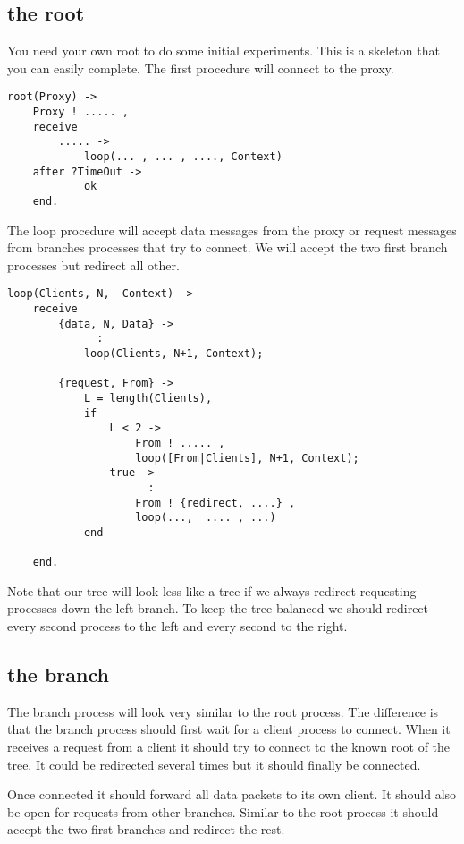 \documentclass[a4paper,11pt]{article}
\begin{document}
\subsection{the root}

You need your own root to do some initial experiments. This is a
skeleton that you can easily complete. The first procedure will
connect to the proxy.

\begin{verbatim}
root(Proxy) ->
    Proxy ! ..... ,
    receive 
        ..... ->
            loop(... , ... , ...., Context)
    after ?TimeOut ->
            ok
    end.
\end{verbatim}

The loop procedure will accept data messages from the proxy or request
messages from branches processes that try to connect. We will accept
the two first branch processes but redirect all other.

\begin{verbatim}
loop(Clients, N,  Context) ->
    receive 
        {data, N, Data} ->
              :
            loop(Clients, N+1, Context);

        {request, From} ->
            L = length(Clients),
            if 
                L < 2 ->
                    From ! ..... ,
                    loop([From|Clients], N+1, Context);
                true ->
                      :
                    From ! {redirect, ....} ,
                    loop(...,  .... , ...)
            end

    end.
\end{verbatim}

Note that our tree will look less like a tree if we always redirect
requesting processes down the left branch. To keep the tree
balanced we should redirect every second process to the left and every
second to the right.


\subsection{the branch}

The branch process will look very similar to the root process. The
difference is that the branch process should first wait for a client
process to connect. When it receives a request from a client it should
try to connect to the known root of the tree. It could be redirected
several times but it should finally be connected.

Once connected it should forward all data packets to its own client. It
should also be open for requests from other branches. Similar to the
root process it should accept the two first branches and redirect the rest.
\end{document}
